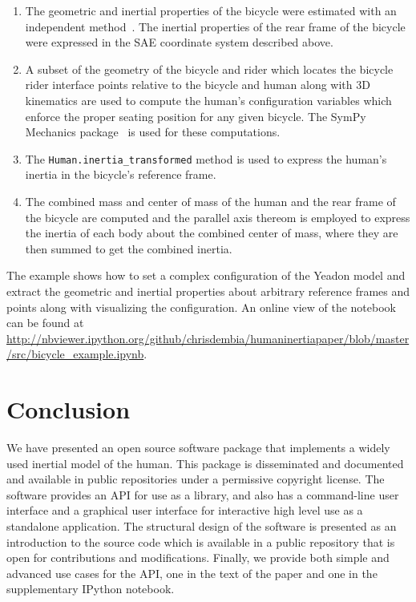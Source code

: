 \documentclass[10pt]{article}
\begin{document}
\begin{enumerate}
  \item The geometric and inertial properties of the bicycle were estimated
    with an independent method~\cite{Moore2012}. The inertial properties of the
    rear frame of the bicycle were expressed in the SAE coordinate system
    described above.
  \item A subset of the geometry of the bicycle and rider which locates the
    bicycle rider interface points relative to the bicycle and human along with
    3D kinematics are used to compute the human's configuration variables which
    enforce the proper seating position for any given bicycle. The SymPy
    Mechanics package~\cite{Gede2013} is used for these computations.
  \item The \verb+Human.inertia_transformed+ method is used to express the
    human's inertia in the bicycle's reference frame.
  \item The combined mass and center of mass of the human and the rear frame of
    the bicycle are computed and the parallel axis thereom is employed to
    express the inertia of each body about the combined center of mass, where
    they are then summed to get the combined inertia.
\end{enumerate}

The example shows how to set a complex configuration of the Yeadon model and
extract the geometric and inertial properties about arbitrary reference frames
and points along with visualizing the configuration. An online view of the
notebook can be found at
\url{http://nbviewer.ipython.org/github/chrisdembia/humaninertiapaper/blob/master/src/bicycle_example.ipynb}.

\section*{Conclusion}
We have presented an open source software package that implements a widely used
inertial model of the human. This package is disseminated and documented and
available in public repositories under a permissive copyright license. The
software provides an API for use as a library, and also has a command-line
user interface and a graphical user interface for interactive high level use as
a standalone application. The structural design of the software is presented as
an introduction to the source code which is available in a public repository
that is open for contributions and modifications. Finally, we provide both
simple and advanced use cases for the API, one in the text of the paper and one
in the supplementary IPython notebook.
\end{document}
